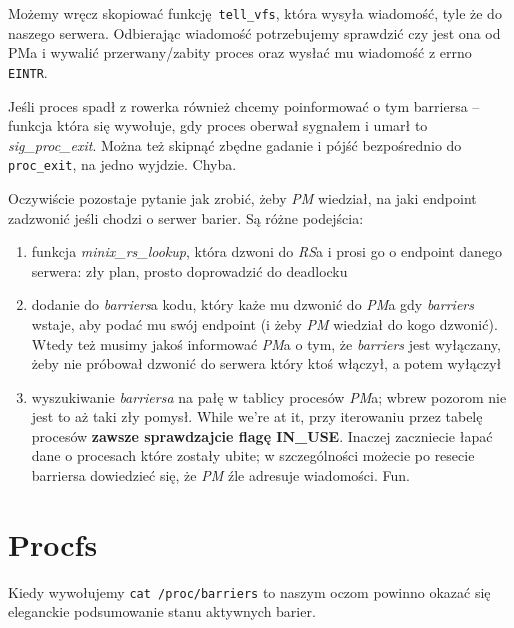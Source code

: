 Możemy wręcz skopiować funkcję \texttt{tell\_vfs}, która wysyła wiadomość, tyle że do naszego serwera.
Odbierając wiadomość potrzebujemy sprawdzić czy jest ona od PMa i wywalić przerwany/zabity proces oraz wysłać mu wiadomość z errno \texttt{EINTR}.

Jeśli proces spadł z rowerka również chcemy poinformować o tym barriersa -- funkcja która się wywołuje, gdy proces oberwał sygnałem i umarł to \textit{sig\_proc\_exit}.
Można też skipnąć zbędne gadanie i pójść bezpośrednio do \texttt{proc\_exit}, na jedno wyjdzie. Chyba.

Oczywiście pozostaje pytanie jak zrobić, żeby \textit{PM} wiedział, na jaki endpoint zadzwonić jeśli chodzi o serwer barier. Są różne podejścia:

\begin{enumerate}
	\item funkcja \textit{minix\_rs\_lookup}, która dzwoni do \textit{RS}a i prosi go o endpoint danego serwera: zły plan, prosto doprowadzić do deadlocku
	\item dodanie do \textit{barriers}a kodu, który każe mu dzwonić do \textit{PM}a gdy \textit{barriers} wstaje, aby podać mu swój endpoint (i żeby \textit{PM} wiedział do kogo dzwonić). Wtedy też musimy jakoś informować \textit{PM}a o tym, że \textit{barriers} jest wyłączany, żeby nie próbował dzwonić do serwera który ktoś włączył, a potem wyłączył
	\item wyszukiwanie \textit{barriersa} na pałę w tablicy procesów \textit{PM}a; wbrew pozorom nie jest to aż taki zły pomysł. While we're at it, przy iterowaniu przez tabelę procesów \textbf{zawsze sprawdzajcie flagę IN\_USE}. Inaczej zaczniecie łapać dane o procesach które zostały ubite; w szczególności możecie po resecie barriersa dowiedzieć się, że \textit{PM} źle adresuje wiadomości. Fun.
\end{enumerate}

\section{Procfs}
Kiedy wywołujemy \texttt{cat /proc/barriers} to naszym oczom powinno okazać się eleganckie podsumowanie stanu aktywnych barier.

